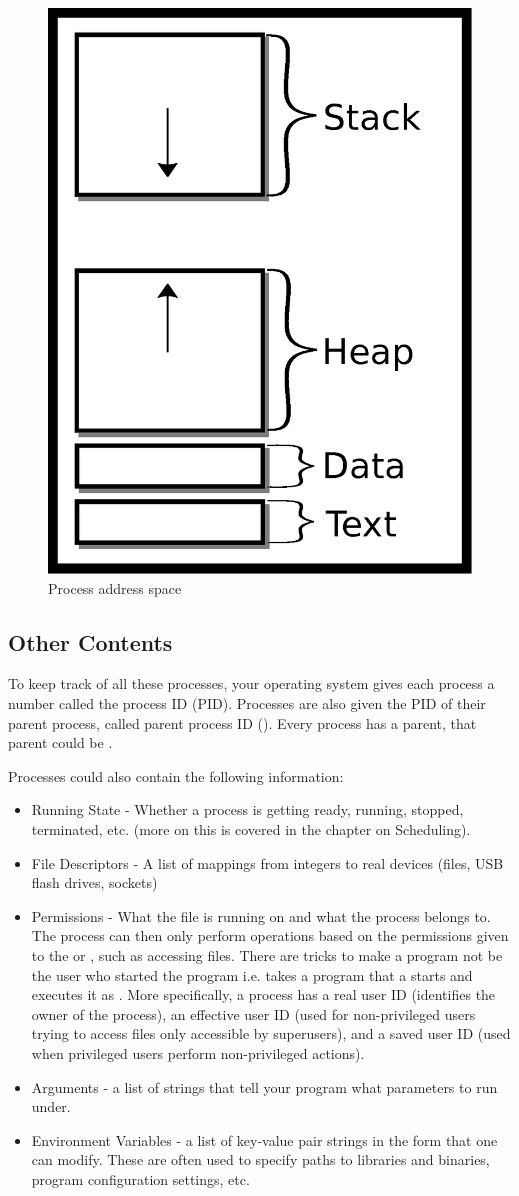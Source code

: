 \begin{figure}[H]
\centering
\includegraphics[width=.3\textwidth]{processes/drawings/address_space.eps}
\caption{Process address space}
\end{figure}



\subsection{Other Contents}

To keep track of all these processes, your operating system gives each process a number called the process ID (PID).
Processes are also given the PID of their parent process, called parent process ID ().
Every process has a parent, that parent could be .

Processes could also contain the following information:

\begin{itemize}
    \item Running State - Whether a process is getting ready, running, stopped, terminated, etc. (more on this is covered in the chapter on Scheduling).
    \item File Descriptors - A list of mappings from integers to real devices (files, USB flash drives, sockets)
    \item Permissions - What  the file is running on and what  the process belongs to.
          The process can then only perform operations based on the permissions given to the  or , such as accessing files.
          There are tricks to make a program not be the user who started the program i.e.  takes a program that a  starts and executes it as .
          More specifically, a process has a real user ID (identifies the owner of the process), an effective user ID (used for non-privileged users trying to access files only accessible by superusers), and a saved user ID (used when privileged users perform non-privileged actions).
    \item Arguments - a list of strings that tell your program what parameters to run under.
    \item Environment Variables - a list of key-value pair strings in the form  that one can modify. These are often used to specify paths to libraries and binaries, program configuration settings, etc.
\end{itemize}

